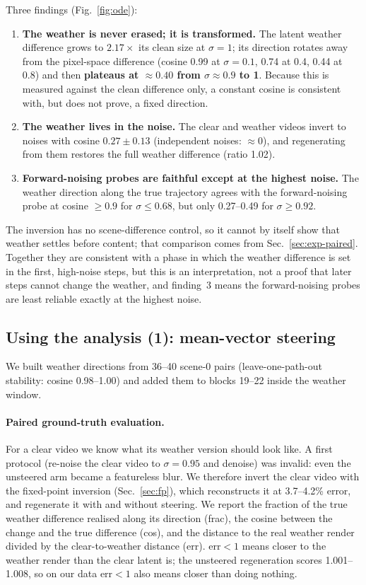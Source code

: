 \documentclass[11pt,a4paper]{article}
\begin{document}
Three findings (Fig.~\ref{fig:ode}):
\begin{enumerate}
  \item \textbf{The weather is never erased; it is transformed.} The latent weather difference grows to $2.17\times$ its clean size at $\sigma{=}1$; its direction rotates away from the pixel-space difference (cosine 0.99 at $\sigma{=}0.1$, 0.74 at 0.4, 0.44 at 0.8) and then \textbf{plateaus at $\approx0.40$ from $\sigma\approx0.9$ to 1}. Because this is measured against the clean difference only, a constant cosine is consistent with, but does not prove, a fixed direction.
  \item \textbf{The weather lives in the noise.} The clear and weather videos invert to noises with cosine $0.27\pm0.13$ (independent noises: $\approx0$), and regenerating from them restores the full weather difference (ratio 1.02).
  \item \textbf{Forward-noising probes are faithful except at the highest noise.} The weather direction along the true trajectory agrees with the forward-noising probe at cosine $\ge0.9$ for $\sigma\le0.68$, but only 0.27--0.49 for $\sigma\ge0.92$.
\end{enumerate}
The inversion has no scene-difference control, so it cannot by itself show that weather settles before content; that comparison comes from Sec.~\ref{sec:exp-paired}. Together they are consistent with a phase in which the weather difference is set in the first, high-noise steps, but this is an interpretation, not a proof that later steps cannot change the weather, and finding~3 means the forward-noising probes are least reliable exactly at the highest noise.

\subsection{Using the analysis (1): mean-vector steering}
\label{sec:exp-steer}

We built weather directions from 36--40 scene-0 pairs (leave-one-path-out stability: cosine 0.98--1.00) and added them to blocks 19--22 inside the weather window.

\paragraph{Paired ground-truth evaluation.}
For a clear video we know what its weather version should look like. A first protocol (re-noise the clear video to $\sigma{=}0.95$ and denoise) was invalid: even the unsteered arm became a featureless blur.
We therefore invert the clear video with the fixed-point inversion (Sec.~\ref{sec:fp}), which reconstructs it at 3.7--4.2\% error, and regenerate it with and without steering.
We report the fraction of the true weather difference realised along its direction (frac), the cosine between the change and the true difference (cos), and the distance to the real weather render divided by the clear-to-weather distance (err). err${<}1$ means closer to the weather render than the clear latent is; the unsteered regeneration scores 1.001--1.008, so on our data err${<}1$ also means closer than doing nothing.
\end{document}
